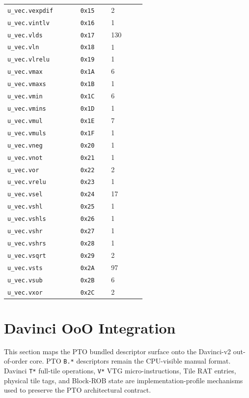 {\begin{longtable}{@{}L{0.38\linewidth}R{0.16\linewidth}R{0.18\linewidth}@{}}
\texttt{u\_vec.vexpdif} & \texttt{0x15} & 2 \\
\texttt{u\_vec.vintlv} & \texttt{0x16} & 1 \\
\texttt{u\_vec.vlds} & \texttt{0x17} & 130 \\
\texttt{u\_vec.vln} & \texttt{0x18} & 1 \\
\texttt{u\_vec.vlrelu} & \texttt{0x19} & 1 \\
\texttt{u\_vec.vmax} & \texttt{0x1A} & 6 \\
\texttt{u\_vec.vmaxs} & \texttt{0x1B} & 1 \\
\texttt{u\_vec.vmin} & \texttt{0x1C} & 6 \\
\texttt{u\_vec.vmins} & \texttt{0x1D} & 1 \\
\texttt{u\_vec.vmul} & \texttt{0x1E} & 7 \\
\texttt{u\_vec.vmuls} & \texttt{0x1F} & 1 \\
\texttt{u\_vec.vneg} & \texttt{0x20} & 1 \\
\texttt{u\_vec.vnot} & \texttt{0x21} & 1 \\
\texttt{u\_vec.vor} & \texttt{0x22} & 2 \\
\texttt{u\_vec.vrelu} & \texttt{0x23} & 1 \\
\texttt{u\_vec.vsel} & \texttt{0x24} & 17 \\
\texttt{u\_vec.vshl} & \texttt{0x25} & 1 \\
\texttt{u\_vec.vshls} & \texttt{0x26} & 1 \\
\texttt{u\_vec.vshr} & \texttt{0x27} & 1 \\
\texttt{u\_vec.vshrs} & \texttt{0x28} & 1 \\
\texttt{u\_vec.vsqrt} & \texttt{0x29} & 2 \\
\texttt{u\_vec.vsts} & \texttt{0x2A} & 97 \\
\texttt{u\_vec.vsub} & \texttt{0x2B} & 6 \\
\texttt{u\_vec.vxor} & \texttt{0x2C} & 2 \\
\bottomrule
\end{longtable}
}

\section{Davinci OoO Integration}
This section maps the PTO bundled descriptor surface onto the Davinci-v2 out-of-order core. PTO \texttt{B.*} descriptors remain the CPU-visible manual format. Davinci \texttt{T*} full-tile operations, \texttt{V*} VTG micro-instructions, Tile RAT entries, physical tile tags, and Block-ROB state are implementation-profile mechanisms used to preserve the PTO architectural contract.

